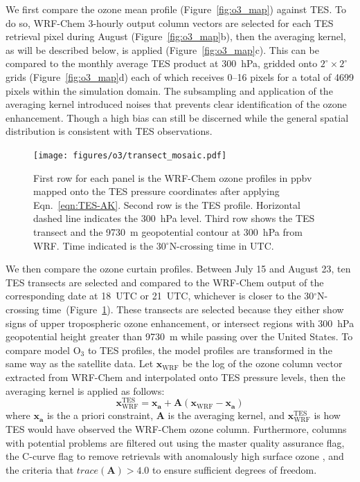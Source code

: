 We first compare the ozone mean profile (Figure~\ref{fig:o3_map}) against TES. To
do so, WRF-Chem 3-hourly output column vectors are selected for each TES retrieval
pixel during August (Figure~\ref{fig:o3_map}b), then the averaging kernel, as will be
described below, is applied (Figure~\ref{fig:o3_map}c). This can be compared to the
monthly average TES product at 300~hPa, gridded onto $2^\circ\times2^\circ$ grids (Figure~\ref{fig:o3_map}d)
each of which receives 0--16 pixels for a total of 4699 pixels within the simulation
domain. The subsampling and application of the averaging kernel introduced noises
that prevents clear identification of the ozone enhancement. Though a high bias
can still be discerned while the general spatial distribution is consistent with TES observations.

 \begin{figure}
 \texttt{[image: figures/o3/transect\_mosaic.pdf]}
 \caption{First row for each panel is the WRF-Chem ozone profiles in ppbv mapped onto the TES
pressure coordinates after applying Eqn.~\ref{eqn:TES-AK}. Second row is the TES profile. Horizontal
dashed line indicates the 300~hPa level. Third row shows the TES transect and the 9730~m
geopotential contour at 300~hPa from WRF. Time indicated is the 30$^\circ$N-crossing time in UTC.}
 \label{fig:o3_transect}
 \end{figure}

We then compare the ozone curtain profiles. Between July 15 and August 23, ten TES
transects are selected and compared to the WRF-Chem output of the corresponding
date at 18~UTC or 21~UTC, whichever is closer to the 30$^\circ$N-crossing
time~(Figure~\ref{fig:o3_transect}). These transects are selected because they either show
signs of upper tropospheric ozone enhancement, or intersect regions with 300~hPa
geopotential height greater than 9730~m  while passing over the United States.
To compare model O$_3$ to TES profiles, the model profiles are transformed in
the same way as the satellite data. Let $\mathbf{x}_{\mathrm{WRF}}$ be the log of the ozone column
vector extracted from WRF-Chem and interpolated onto TES pressure levels, then the
averaging kernel is applied as follows:
	\begin{equation}\label{eqn:TES-AK}
		\mathbf{x}_{\mathrm{WRF}}^{\mathrm{TES}} = \mathbf{x_a} +
		\mathbf{A}\left(\mathbf{x}_{\mathrm{WRF}}-\mathbf{x_a}\right)
	\end{equation}
where $\mathbf{x_a}$ is the a priori constraint, $\mathbf{A}$ is the averaging kernel,
and $\mathbf{x}_{\mathrm{WRF}}^{\mathrm{TES}}$ is how TES would have observed the
WRF-Chem ozone column. Furthermore, columns with potential problems are filtered
out using the master quality assurance flag, the C-curve flag to remove retrievals with
anomalously high surface ozone \citep{Zhang:2010fk}, and the criteria that
$trace(\mathbf{A})>4.0$ to ensure sufficient degrees of freedom.

